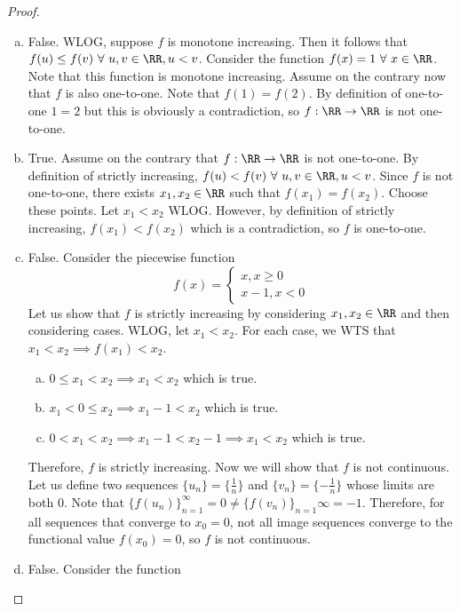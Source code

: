 \documentclass[12pt]{scrartcl}
\begin{document}
\begin{proof}
  
  \hfill

  \begin{enumerate}[a.]
    \item False. WLOG, suppose $f$ is monotone increasing. Then it follows that $f(u) \leq f(v) \ \forall \ u, v \in \RR, u < v$. 
    Consider the function $f(x) = 1 \ \forall \ x \in \RR$. Note that this function is monotone increasing. 
    Assume on the contrary now that $f$ is also one-to-one. Note that $f(1) = f(2)$. By definition of one-to-one 
    $1 = 2$ but this is obviously a contradiction, so $f: \RR \to \RR$ is not one-to-one.
    \item True. Assume on the contrary that $f: \RR \to \RR$ is not one-to-one. By definition of strictly increasing, 
    $f(u) < f(v) \ \forall \ u, v \in \RR, u < v$. 
    Since $f$ is not one-to-one, there exists $x_1, x_2 \in \RR$ such that $f(x_1) = f(x_2)$. Choose 
    these points. Let $x_1 < x_2$ WLOG. However, by definition of strictly increasing, $f(x_1) < f(x_2)$
    which is a contradiction, so $f$ is one-to-one.
    \item False. Consider the piecewise function
    \[f(x) = \begin{cases}
      x, x \geq 0\\
      x - 1, x < 0
    \end{cases}\]
    Let us show that $f$ is strictly increasing by considering $x_1, x_2 \in \RR$ and then considering cases. 
    WLOG, let $x_1 < x_2$. For each case, we WTS that $x_1 < x_2 \implies f(x_1) < x_2$. 
    \begin{enumerate}[a.]
      \item $0 \leq x_1 < x_2 \implies x_1 < x_2$ which is true.
      \item $x_1 < 0 \leq x_2 \implies x_1 - 1 < x_2$ which is true.
      \item $0 < x_1 < x_2 \implies x_1 - 1 < x_2 - 1 \implies x_1 < x_2$ which is true. 
    \end{enumerate}
    Therefore, $f$ is strictly increasing. Now we will show that $f$ is not continuous. Let us define 
    two sequences $\{u_n\} = \{\frac{1}{n}\}$ and $\{v_n\} = \{-\frac{1}{n}\}$ whose limits are both
    $0$. Note that $\{f(u_n)\}_{n=1}^\infty = 0 \neq \{f(v_n)\}_{n=1}\infty = -1$. Therefore, 
    for all sequences that converge to $x_0 = 0$, not all image sequences converge to the functional value 
    $f(x_0) = 0$, so $f$ is not continuous.
    \item False. Consider the function 

\end{enumerate}
\end{proof}
\end{document}
